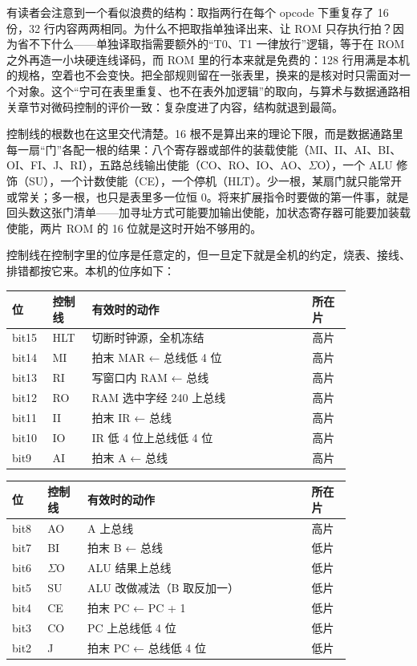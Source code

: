 有读者会注意到一个看似浪费的结构：取指两行在每个 opcode 下重复存了 16 份，32 行内容两两相同。为什么不把取指单独译出来、让 ROM 只存执行拍？因为省不下什么——单独译取指需要额外的“T0、T1 一律放行”逻辑，等于在 ROM 之外再造一小块硬连线译码，而 ROM 里的行本来就是免费的：128 行用满是本机的规格，空着也不会变快。把全部规则留在一张表里，换来的是核对时只需面对一个对象。这个“宁可在表里重复、也不在表外加逻辑”的取向，与算术与数据通路相关章节对微码控制的评价一致：复杂度进了内容，结构就退到最简。

控制线的根数也在这里交代清楚。16 根不是算出来的理论下限，而是数据通路里每一扇“门”各配一根的结果：八个寄存器或部件的装载使能（MI、II、AI、BI、OI、FI、J、RI），五路总线输出使能（CO、RO、IO、AO、$\Sigma$O），一个 ALU 修饰（SU），一个计数使能（CE），一个停机（HLT）。少一根，某扇门就只能常开或常关；多一根，也只是表里多一位恒 0。将来扩展指令时要做的第一件事，就是回头数这张门清单——加寻址方式可能要加输出使能，加状态寄存器可能要加装载使能，两片 ROM 的 16 位就是这时开始不够用的。

控制线在控制字里的位序是任意定的，但一旦定下就是全机的约定，烧表、接线、排错都按它来。本机的位序如下：

\begin{longtable}{L{0.08\linewidth}L{0.10\linewidth}L{0.56\linewidth}L{0.10\linewidth}}
\toprule
位 & 控制线 & 有效时的动作 & 所在片 \\
\midrule
bit15 & HLT & 切断时钟源，全机冻结 & 高片 \\\tablerowrule
bit14 & MI & 拍末 MAR ← 总线低 4 位 & 高片 \\\tablerowrule
bit13 & RI & 写窗口内 RAM ← 总线 & 高片 \\\tablerowrule
bit12 & RO & RAM 选中字经 240 上总线 & 高片 \\\tablerowrule
bit11 & II & 拍末 IR ← 总线 & 高片 \\\tablerowrule
bit10 & IO & IR 低 4 位上总线低 4 位 & 高片 \\\tablerowrule
bit9 & AI & 拍末 A ← 总线 & 高片 \\
\bottomrule
\end{longtable}

\begin{longtable}{L{0.08\linewidth}L{0.10\linewidth}L{0.56\linewidth}L{0.10\linewidth}}
\toprule
位 & 控制线 & 有效时的动作 & 所在片 \\
\midrule
bit8 & AO & A 上总线 & 高片 \\\tablerowrule
bit7 & BI & 拍末 B ← 总线 & 低片 \\\tablerowrule
bit6 & $\Sigma$O & ALU 结果上总线 & 低片 \\\tablerowrule
bit5 & SU & ALU 改做减法（B 取反加一） & 低片 \\\tablerowrule
bit4 & CE & 拍末 PC ← PC + 1 & 低片 \\\tablerowrule
bit3 & CO & PC 上总线低 4 位 & 低片 \\\tablerowrule
bit2 & J & 拍末 PC ← 总线低 4 位 & 低片 \\
\bottomrule
\end{longtable}

